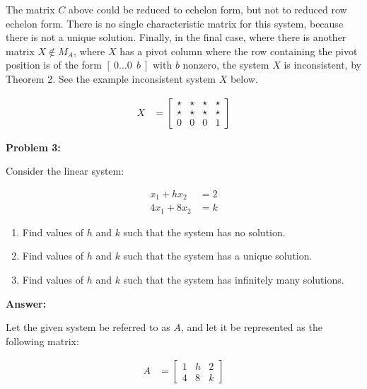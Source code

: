 \documentclass[10pt,letterpaper,final]{report}
\begin{document}
The matrix $C$ above could be reduced to echelon form, but not to reduced row echelon form. There is no single characteristic matrix for this system, because there is not a unique solution. Finally, in the final case, where there is another matrix $X \not\in M_A$, where $X$ has a pivot column where the row containing the pivot position is of the form $[\ 0 \ldots 0\ \ b\ ] \text{ with $b$ nonzero}$, the system $X$ is inconsistent, by Theorem 2. See the example inconsistent system $X$ below.

\begin{align*}
  X & =
  \left[\begin{array}{rrr|r}
      \star & \star & \star & \star \\
      \star & \star & \star & \star \\
      0     & 0     & 0     & 1
    \end{array}\right]
\end{align*}

\pagebreak

\noindent\textbf{Problem 3:}
\medskip

Consider the linear system:

\begin{align*}
  x_1  + hx_2 & = 2 \\
  4x_1 + 8x_2 & = k
\end{align*}

\begin{enumerate}
  \item Find values of $h$ and $k$ such that the system has no solution.
  \item Find values of $h$ and $k$ such that the system has a unique solution.
  \item Find values of $h$ and $k$ such that the system has infinitely many solutions.
\end{enumerate}


\medskip
\noindent\textbf{Answer:}
\medskip

Let the given system be referred to as $A$, and let it be represented as the following matrix:

\begin{align*}
  A & =
  \left[\begin{array}{rr|r}
      1 & h & 2 \\
      4 & 8 & k
    \end{array}\right]
\end{align*}
\end{document}
